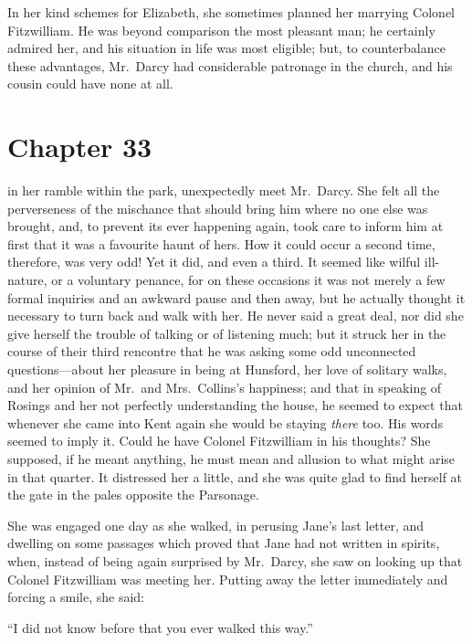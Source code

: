 In her kind schemes for Elizabeth, she sometimes planned her
marrying Colonel Fitzwilliam.  He was beyond comparison the
most pleasant man; he certainly admired her, and his situation in
life was most eligible; but, to counterbalance these advantages,
Mr.\ Darcy had considerable patronage in the church, and his
cousin could have none at all.



\chapter{Chapter 33}


 in her ramble within the park,
unexpectedly meet Mr.\ Darcy.  She felt all the perverseness of
the mischance that should bring him where no one else was brought,
and, to prevent its ever happening again, took care to inform him
at first that it was a favourite haunt of hers.  How it could occur
a second time, therefore, was very odd!  Yet it did, and even a
third.  It seemed like wilful ill-nature, or a voluntary penance,
for on these occasions it was not merely a few formal inquiries
and an awkward pause and then away, but he actually thought it
necessary to turn back and walk with her.  He never said a great
deal, nor did she give herself the trouble of talking or of
listening much; but it struck her in the course of their third
rencontre that he was asking some odd unconnected questions---about
her pleasure in being at Hunsford, her love of solitary walks, and
her opinion of Mr.\ and Mrs.\ Collins's happiness; and that in
speaking of Rosings and her not perfectly understanding the house,
he seemed to expect that whenever she came into Kent again she
would be staying \emph{there} too.  His words seemed to imply it.  Could
he have Colonel Fitzwilliam in his thoughts?  She supposed, if he
meant anything, he must mean and allusion to what might arise in
that quarter.  It distressed her a little, and she was quite glad
to find herself at the gate in the pales opposite the Parsonage.

She was engaged one day as she walked, in perusing Jane's last
letter, and dwelling on some passages which proved that Jane
had not written in spirits, when, instead of being again surprised
by Mr.\ Darcy, she saw on looking up that Colonel Fitzwilliam
was meeting her.  Putting away the letter immediately and
forcing a smile, she said:

``I did not know before that you ever walked this way.''

